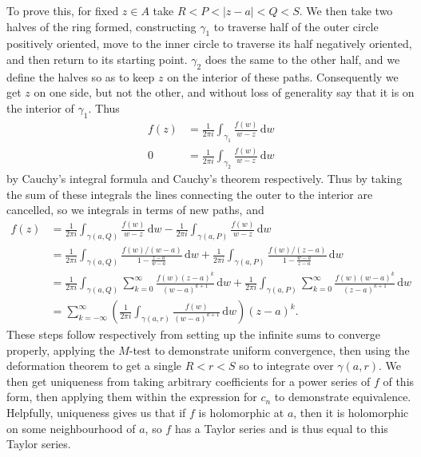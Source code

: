 \documentclass{tikzposter} %
\begin{document}
\begin{columns}
{    To prove this, for fixed $z \in A$ take $R < P < |z-a| < Q < S$. We then take two halves of the ring formed, constructing $\gamma_{1}$ to traverse half of the outer circle positively oriented, move to the inner circle to traverse its half negatively oriented, and then return to its starting point. $\gamma_{2}$ does the same to the other half, and we define the halves so as to keep $z$ on the interior of these paths. Consequently we get $z$ on one side, but not the other, and without loss of generality say that it is on the interior of $\gamma_{1}$. Thus
    \begin{align*}
      f(z) &= \frac{1}{2\pi i} \int_{\gamma_{1}} \frac{f(w)}{w-z} \, \mathrm{d}w \\
      0 &= \frac{1}{2\pi i} \int_{\gamma_{2}} \frac{f(w)}{w-z} \, \mathrm{d}w
    \end{align*}
    by Cauchy's integral formula and Cauchy's theorem respectively. Thus by taking the sum of these integrals the lines connecting the outer to the interior are cancelled, so we integrals in terms of new paths, and
    \begin{align*}
      f(z) &= \frac{1}{2 \pi i} \int_{\gamma(a,Q)} \frac{f(w)}{w-z} \, \mathrm{d}w - \frac{1}{2\pi i} \int_{\gamma(a,P)} \frac{f(w)}{w-z} \, \mathrm{d}w \\
      &= \frac{1}{2 \pi i} \int_{\gamma(a,Q)} \frac{f(w)/(w-a)}{1-\frac{z-a}{w-a}} \, \mathrm{d}w + \frac{1}{2 \pi i} \int_{\gamma(a,P)} \frac{f(w)/(z-a)}{1-\frac{w-a}{z-a}} \, \mathrm{d}w \\
      &= \frac{1}{2 \pi i} \int_{\gamma(a,Q)} \sum_{k=0}^{\infty} \frac{f(w)(z-a)^{k}}{(w-a)^{k+1}} \, \mathrm{d}w + \frac{1}{2 \pi i}\int_{\gamma(a,P)} \sum_{k=0}^{\infty} \frac{f(w)(w-a)^{k}}{(z-a)^{k+1}} \, \mathrm{d}w \\
      &= \sum_{k=-\infty}^{\infty} \left(\frac{1}{2 \pi i} \int_{\gamma(a,r)} \frac{f(w)}{(w-a)^{k+1}} \, \mathrm{d}w\right) (z-a)^{k}.
    \end{align*}
    These steps follow respectively from setting up the infinite sums to converge properly, applying the $M$-test to demonstrate uniform convergence, then using the deformation theorem to get a single $R < r < S$ so to integrate over $\gamma(a,r)$. We then get uniqueness from taking arbitrary coefficients for a power series of $f$ of this form, then applying them within the expression for $c_{n}$ to demonstrate equivalence. \\

    Helpfully, uniqueness gives us that if $f$ is holomorphic at $a$, then it is holomorphic on some neighbourhood of $a$, so $f$ has a Taylor series and is thus equal to this Taylor series. \\

}
\end{columns}
\end{document}
